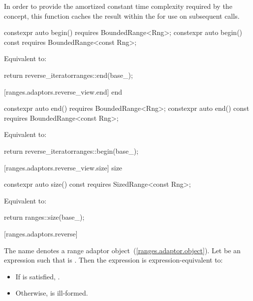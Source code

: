 \begin{addedblock}
\begin{itemdescr}
\pnum
\remarks In order to provide the amortized constant time complexity required by
the  concept, this function caches the result within the
 for use on subsequent calls.
\end{itemdescr}

%
\begin{itemdecl}
constexpr auto begin() requires BoundedRange<Rng>;
constexpr auto begin() const requires BoundedRange<const Rng>;
\end{itemdecl}

\begin{itemdescr}
\pnum
\effects Equivalent to:
\begin{codeblock}
return reverse_iterator{ranges::end(base_)};
\end{codeblock}
\end{itemdescr}

[ranges.adaptors.reverse_view.end]{ end}

%
\begin{itemdecl}
constexpr auto end() requires BoundedRange<Rng>;
constexpr auto end() const requires BoundedRange<const Rng>;
\end{itemdecl}

\begin{itemdescr}
\pnum
\effects Equivalent to:
\begin{codeblock}
return reverse_iterator{ranges::begin(base_)};
\end{codeblock}
\end{itemdescr}

[ranges.adaptors.reverse_view.size]{ size}

%
\begin{itemdecl}
constexpr auto size() const requires SizedRange<const Rng>;
\end{itemdecl}

\begin{itemdescr}
\pnum
\effects Equivalent to:
\begin{codeblock}
return ranges::size(base_);
\end{codeblock}
\end{itemdescr}

[ranges.adaptors.reverse]{}

\pnum
The name  denotes a range adaptor
object~(\ref{ranges.adaptor.object}).
Let  be an expression such that  is .
Then the expression  is expression-equivalent to:

\begin{itemize}
\item If  is satisfied,
.
\item Otherwise,  is ill-formed.
\end{itemize}

\end{addedblock}
